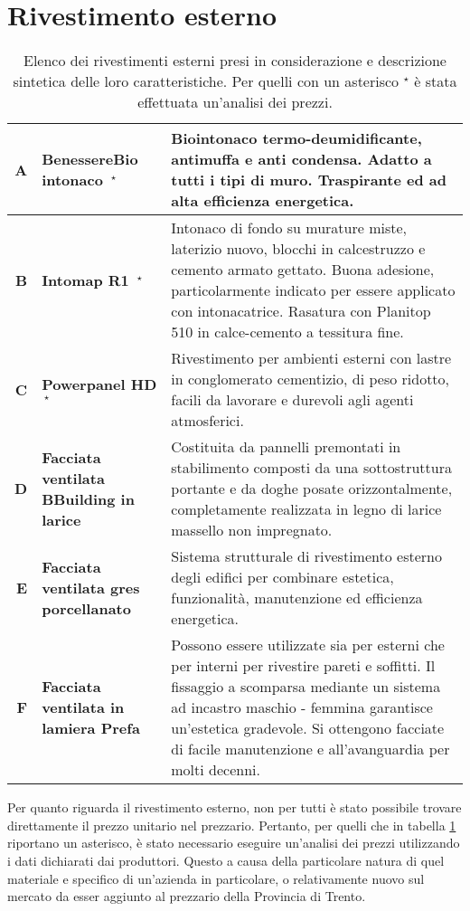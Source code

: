 \section{Rivestimento esterno}
\begin{table}[htbp]
\caption[Elenco dei rivestimenti esterni presi in considerazione e descrizione sintetica delle loro caratteristiche]{Elenco dei rivestimenti esterni presi in considerazione e descrizione sintetica delle loro caratteristiche. Per quelli con un asterisco $^\star$ è stata effettuata un'analisi dei prezzi.}
\label{MaterialiRIV}
\centering
\begin{tabularx}{\textwidth}{rXX}
    \toprule
        \textbf{A} & \textbf{BenessereBio intonaco $\,^\star$} & Biointonaco termo-deumidificante, antimuffa e anti condensa. 
        Adatto a tutti i tipi di muro. Traspirante ed ad alta efficienza energetica. \\\midrule
        \textbf{B} & \textbf{Intomap R1 $\,^\star$} & Intonaco di fondo su murature miste, laterizio nuovo, blocchi in calcestruzzo e cemento armato gettato.  Buona adesione, particolarmente indicato per essere applicato con intonacatrice. 
        Rasatura con Planitop 510 in calce-cemento a tessitura fine.\\\midrule
        \textbf{C} & \textbf{Powerpanel HD $\,^\star$} & Rivestimento per ambienti esterni con lastre in conglomerato cementizio, di peso ridotto, facili da lavorare e durevoli agli agenti atmosferici.\\\midrule
        \textbf{D} & \textbf{Facciata ventilata BBuilding in larice} & Costituita da pannelli premontati in stabilimento composti da una sottostruttura portante e da doghe posate orizzontalmente, completamente realizzata in legno di larice massello non impregnato.\\\midrule
        \textbf{E} & \textbf{Facciata ventilata gres porcellanato} & Sistema strutturale di rivestimento esterno degli edifici per combinare estetica, funzionalità, manutenzione ed efficienza energetica. \\\midrule
        \textbf{F} & \textbf{Facciata ventilata in lamiera Prefa} & Possono essere utilizzate sia per esterni che per interni per rivestire pareti e soffitti. Il fissaggio a scomparsa mediante un sistema ad incastro maschio - femmina garantisce un'estetica gradevole. Si ottengono facciate di facile manutenzione e all'avanguardia per molti decenni.\\
    \bottomrule
\end{tabularx}
\end{table}

Per quanto riguarda il rivestimento esterno, non per tutti è stato possibile trovare direttamente il prezzo unitario nel prezzario. 
Pertanto, per quelli che in tabella \ref{MaterialiRIV} riportano un asterisco, è stato necessario eseguire un'analisi dei prezzi utilizzando i dati dichiarati dai produttori. 
Questo a causa della particolare natura di quel materiale e specifico di un'azienda in particolare, o relativamente nuovo sul mercato da esser aggiunto al prezzario della Provincia di Trento.

